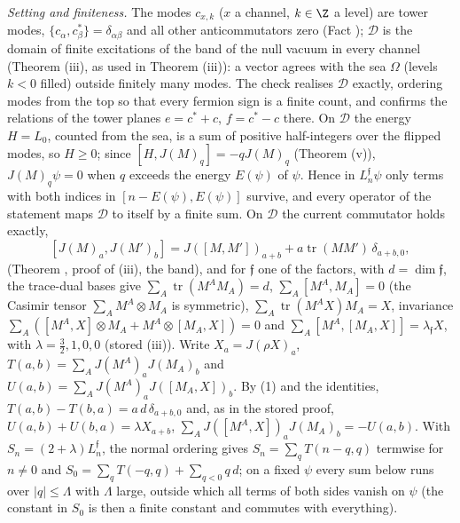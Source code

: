 \emph{Setting and finiteness.} The modes $c_{x,k}$ ($x$ a channel, $k \in \Z$ a level) are tower modes, $\{c_{\alpha}, c^{*}_{\beta}\} = \delta_{\alpha\beta}$ and all other anticommutators zero (Fact ); $\mathcal{D}$ is the domain of finite excitations of the band of the null vacuum in every channel (Theorem (iii), as used in Theorem (iii)): a vector agrees with the sea $\Omega$ (levels $k < 0$ filled) outside finitely many modes. The check realises $\mathcal{D}$ exactly, ordering modes from the top so that every fermion sign is a finite count, and confirms the relations of the tower planes $e = c^{*} + c$, $f = c^{*} - c$ there. On $\mathcal{D}$ the energy $H = L_{0}$, counted from the sea, is a sum of positive half-integers over the flipped modes, so $H \ge 0$; since $[H, J(M)_{q}] = -qJ(M)_{q}$ (Theorem (v)), $J(M)_{q}\psi = 0$ when $q$ exceeds the energy $E(\psi)$ of $\psi$. Hence in $L^{\mathfrak{f}}_{n}\psi$ only terms with both indices in $[n - E(\psi), E(\psi)]$ survive, and every operator of the statement maps $\mathcal{D}$ to itself by a finite sum. On $\mathcal{D}$ the current commutator holds exactly,
\[
[J(M)_{a}, J(M')_{b}] = J([M, M'])_{a+b} + a\operatorname{tr}(MM')\,\delta_{a+b,0}, \tag{1}
\]
(Theorem , proof of (iii), the band), and for $\mathfrak{f}$ one of the factors, with $d = \dim\mathfrak{f}$, the trace-dual bases give $\sum_{A}\operatorname{tr}(M^{A}M_{A}) = d$, $\sum_{A}[M^{A}, M_{A}] = 0$ (the Casimir tensor $\sum_{A}M^{A}\otimes M_{A}$ is symmetric), $\sum_{A}\operatorname{tr}(M^{A}X)M_{A} = X$, invariance $\sum_{A}([M^{A}, X]\otimes M_{A} + M^{A}\otimes[M_{A}, X]) = 0$ and $\sum_{A}[M^{A}, [M_{A}, X]] = \lambda_{\mathfrak{f}}X$, with $\lambda = \tfrac32, 1, 0, 0$ (stored (iii)). Write $X_{a} = J(\rho X)_{a}$, $T(a, b) = \sum_{A}J(M^{A})_{a}J(M_{A})_{b}$ and $U(a, b) = \sum_{A}J(M^{A})_{a}J([M_{A}, X])_{b}$. By (1) and the identities, $T(a, b) - T(b, a) = a\,d\,\delta_{a+b,0}$ and, as in the stored proof, $U(a, b) + U(b, a) = \lambda X_{a+b}$, $\sum_{A}J([M^{A}, X])_{a}J(M_{A})_{b} = -U(a, b)$. With $S_{n} = (2 + \lambda)L^{\mathfrak{f}}_{n}$, the normal ordering gives $S_{n} = \sum_{q}T(n - q, q)$ termwise for $n \ne 0$ and $S_{0} = \sum_{q}T(-q, q) + \sum_{q < 0}q\,d$; on a fixed $\psi$ every sum below runs over $|q| \le \Lambda$ with $\Lambda$ large, outside which all terms of both sides vanish on $\psi$ (the constant in $S_{0}$ is then a finite constant and commutes with everything).

